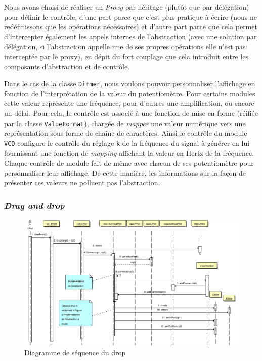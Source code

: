Nous avons choisi de réaliser un \emph{Proxy} par héritage (plutôt
que par délégation) pour définir le contrôle, d'une part parce que
c'est plus pratique à écrire (nous ne redéfinissons que les
opérations nécessaires) et d'autre part parce que cela permet
d'intercepter également les appels internes de l'abstraction (avec
une solution par délégation, si l'abstraction appelle une de ses
propres opérations elle n'est pas interceptée par le
proxy), en dépit du fort couplage que cela introduit entre les
composants d'abstraction et de contrôle.

Dans le cas de la classe \verb!Dimmer!, nous voulons pouvoir
personnaliser l'affichage en fonction de l'interprétation de la
valeur du potentiomètre. Pour certains modules cette valeur
représente une fréquence, pour d'autres une amplification, ou
encore un délai. Pour cela, le contrôle est associé à une fonction
de mise en forme (réifiée par la classe \verb!ValueFormat!),
chargée de \emph{mapper} une valeur numérique vers une
représentation sous forme de chaîne de caractères. Ainsi le
contrôle du module \verb!VCO! configure le contrôle du réglage
\verb!k! de la fréquence du signal à générer en lui fournissant une
fonction de \emph{mapping} affichant la valeur en Hertz de la
fréquence. Chaque contrôle de module fait de même avec chacun de
ses potentiomètre pour personnaliser leur affichage. De cette
manière, les informations sur la façon de présenter ces valeurs ne
polluent pas l'abstraction.

\subsubsection{\textit{Drag and drop}}

\begin{figure}[p]
\centering
\includegraphics[width=20cm, angle=90]{../img/ps/drop-sequence.pdf}
\caption{Diagramme de séquence du drop}
\label{drop-sequence}
\end{figure}

